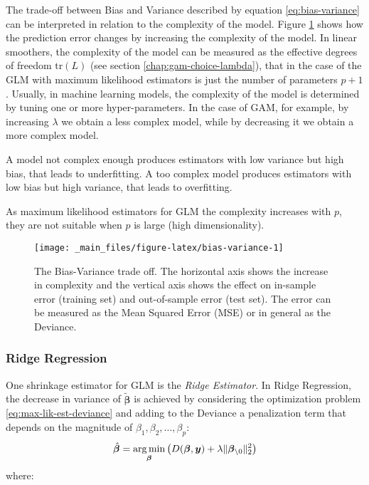 \documentclass[a4paper, nobind]{templates/ociamthesis}
\theoremstyle{definition}
\theoremstyle{definition}
\theoremstyle{definition}
\theoremstyle{remark}
\begin{document}
The trade-off between Bias and Variance described by equation \eqref{eq:bias-variance} can be interpreted in relation to the complexity of the model. Figure \ref{fig:bias-variance} shows how the prediction error changes by increasing the complexity of the model. In linear smoothers, the complexity of the model can be measured as the effective degrees of freedom \(\text{tr}(L)\) (see section \ref{chap:gam-choice-lambda}), that in the case of the GLM with maximum likelihood estimators is just the number of parameters \(p+1\). Usually, in machine learning models, the complexity of the model is determined by tuning one or more hyper-parameters. In the case of GAM, for example, by increasing \(\lambda\) we obtain a less complex model, while by decreasing it we obtain a more complex model.

A model not complex enough produces estimators with low variance but high bias, that leads to underfitting. A too complex model produces estimators with low bias but high variance, that leads to overfitting.

As maximum likelihood estimators for GLM the complexity increases with \(p\), they are not suitable when \(p\) is large (high dimensionality).



\begin{figure}[!hbtp]

{\centering \texttt{[image: \_main\_files/figure-latex/bias-variance-1]} 

}

\caption{The Bias-Variance trade off. The horizontal axis shows the increase in complexity and the vertical axis shows the effect on in-sample error (training set) and out-of-sample error (test set). The error can be measured as the Mean Squared Error (MSE) or in general as the Deviance.}\label{fig:bias-variance}
\end{figure}

\hypertarget{ridge-regression}{%
\subsubsection{Ridge Regression}\label{ridge-regression}}

One shrinkage estimator for GLM is the \emph{Ridge Estimator}. In Ridge Regression, the decrease in variance of \(\tilde{\boldsymbol{\beta}}\) is achieved by considering the optimization problem \eqref{eq:max-lik-est-deviance} and adding to the Deviance a penalization term that depends on the magnitude of \(\beta_1, \beta_2, \dots, \beta_p\):
\begin{equation}
\label{eq:ridge-est-deviance}
\hat{\boldsymbol{\beta}} = \operatorname*{arg\,min}_{\boldsymbol{\beta}}{\left(D(\boldsymbol{\beta}, \boldsymbol{y}) + \lambda \|\boldsymbol{\beta}_{\setminus0}\|_2^2\right)}
\end{equation}
where:
\end{document}
